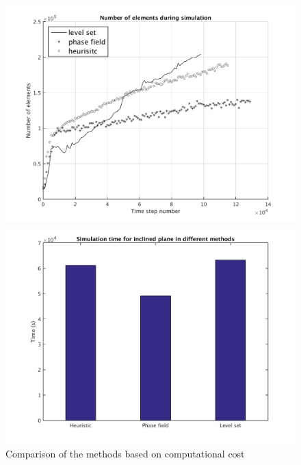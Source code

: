 \documentclass[letterpaper,10pt]{article}
\begin{document}
\begin{figure}[H]
        \begin{minipage}[b]{.5\linewidth}
                \centering
                \includegraphics[scale=0.45]{IMAGES/colima_num_elem.png}
                
        \end{minipage}
        \begin{minipage}[b]{.5 \linewidth}
                \centering
                \includegraphics[scale=0.45]{IMAGES/colima_timing1.png}
                
        \end{minipage}
        \caption{Comparison of the methods based on computational cost }
        \label{compinc}
\end{figure}
\end{document}
